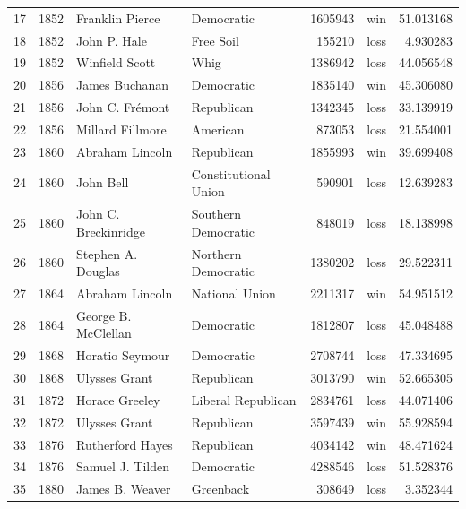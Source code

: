 \documentclass[
  letterpaper,
  DIV=11,
  numbers=noendperiod]{scrreprt}
\begin{document}
\begin{tabular}{lrllrlr}
17  &  1852 &         Franklin Pierce &             Democratic &       1605943 &    win &  51.013168 \\
18  &  1852 &            John P. Hale &              Free Soil &        155210 &   loss &   4.930283 \\
19  &  1852 &          Winfield Scott &                   Whig &       1386942 &   loss &  44.056548 \\
20  &  1856 &          James Buchanan &             Democratic &       1835140 &    win &  45.306080 \\
21  &  1856 &         John C. Frémont &             Republican &       1342345 &   loss &  33.139919 \\
22  &  1856 &        Millard Fillmore &               American &        873053 &   loss &  21.554001 \\
23  &  1860 &         Abraham Lincoln &             Republican &       1855993 &    win &  39.699408 \\
24  &  1860 &               John Bell &   Constitutional Union &        590901 &   loss &  12.639283 \\
25  &  1860 &    John C. Breckinridge &    Southern Democratic &        848019 &   loss &  18.138998 \\
26  &  1860 &      Stephen A. Douglas &    Northern Democratic &       1380202 &   loss &  29.522311 \\
27  &  1864 &         Abraham Lincoln &         National Union &       2211317 &    win &  54.951512 \\
28  &  1864 &     George B. McClellan &             Democratic &       1812807 &   loss &  45.048488 \\
29  &  1868 &         Horatio Seymour &             Democratic &       2708744 &   loss &  47.334695 \\
30  &  1868 &           Ulysses Grant &             Republican &       3013790 &    win &  52.665305 \\
31  &  1872 &          Horace Greeley &     Liberal Republican &       2834761 &   loss &  44.071406 \\
32  &  1872 &           Ulysses Grant &             Republican &       3597439 &    win &  55.928594 \\
33  &  1876 &        Rutherford Hayes &             Republican &       4034142 &    win &  48.471624 \\
34  &  1876 &        Samuel J. Tilden &             Democratic &       4288546 &   loss &  51.528376 \\
35  &  1880 &         James B. Weaver &              Greenback &        308649 &   loss &   3.352344 \\

\end{tabular}
\end{document}
